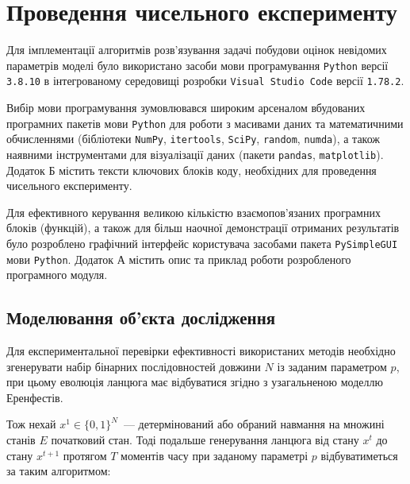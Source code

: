 \chapter{Проведення чисельного експерименту}
\label{chap: practice}

Для імплементації алгоритмів розв’язування задачі побудови оцінок невідомих параметрів моделі було використано засоби мови програмування \texttt{Python} версії \texttt{3.8.10} в інтегрованому середовищі розробки \texttt{Visual Studio Code} версії \texttt{1.78.2}.

Вибір мови програмування зумовлювався широким арсеналом вбудованих програмних пакетів мови \texttt{Python} для роботи з масивами даних та математичними обчисленнями (бібліотеки \texttt{NumPy}, \texttt{itertools}, \texttt{SciPy}, \texttt{random}, \texttt{numda}), а також наявними інструментами для візуалізації даних (пакети \texttt{pandas}, \texttt{matplotlib}). Додаток Б містить тексти ключових блоків коду, необхідних для проведення чисельного експерименту.

Для ефективного керування великою кількістю взаємопов'язаних програмних блоків (функцій), а також для більш наочної демонстрації отриманих результатів було розроблено графічний інтерфейс користувача засобами пакета \texttt{PySimpleGUI} мови \texttt{Python}. Додаток А містить опис та приклад роботи розробленого програмного модуля.

\section{Моделювання об'єкта дослідження}
\label{chap: modeling}

Для експериментальної перевірки ефективності використаних методів необхідно згенерувати набір бінарних послідовностей довжини $N$ із заданим параметром $p$, при цьому еволюція ланцюга має відбуватися згідно з узагальненою моделлю Еренфестів.

Тож нехай $x^1 \in \{ 0,1 \}^N$~--- детермінований або обраний навмання на множині станів $E$ початковий стан. Тоді подальше генерування ланцюга від стану $x^t$ до стану $x^{t+1}$ протягом $T$ моментів часу при заданому параметрі $p$ відбуватиметься за таким алгоритмом:

